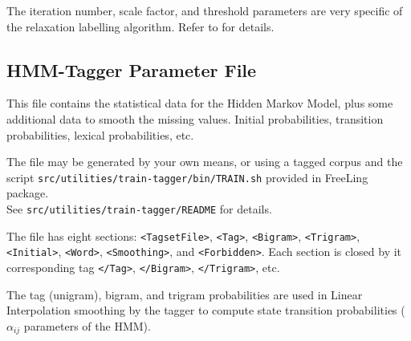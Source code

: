 \documentclass[a4paper]{book}
\begin{document}
  The iteration number, scale factor, and threshold parameters are
  very specific of the relaxation labelling algorithm. Refer to
  \cite{padro98a} for details.


\subsection{HMM-Tagger Parameter File}
\label{file-hmm}

   This file contains the statistical data for the Hidden Markov
   Model, plus some additional data to smooth the missing values.
   Initial probabilities, transition probabilities, lexical
   probabilities, etc.

   The file may be generated by your own means, or using a tagged
   corpus and the script {\tt src/utilities/train-tagger/bin/TRAIN.sh}
   provided in FreeLing package.\\
    See {\tt src/utilities/train-tagger/README} for details.

  The file has eight sections: \verb#<TagsetFile>#, \verb#<Tag>#, \verb#<Bigram>#,
  \verb#<Trigram>#, \verb#<Initial>#, \verb#<Word>#,
  \verb#<Smoothing>#, and \verb#<Forbidden>#. Each section is 
  closed by it corresponding tag \verb#</Tag>#, \verb#</Bigram>#,
  \verb#</Trigram>#, etc.

  The tag (unigram), bigram, and trigram probabilities are used in
  Linear Interpolation smoothing by the tagger to compute state
  transition probabilities ($\alpha_{ij}$ parameters of the HMM).
 
\end{document}
